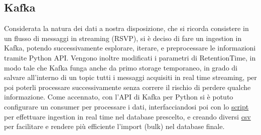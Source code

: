 \documentclass[fleqn,10pt]{SelfArx} %
\begin{document}
{\subsection{Kafka}
Considerata la natura dei dati a nostra disposizione, che si ricorda consistere in un flusso di messaggi in streaming (RSVP), si è deciso di fare un ingestion in Kafka, potendo successivamente esplorare, iterare, e preprocessare le informazioni tramite Python API.
Vengono inoltre modificati i parametri di RetentionTime, in modo tale che Kafka funga anche da primo storage temporaneo, in grado di salvare all'interno di un topic tutti i messaggi acquisiti in real time streaming, per poi poterli processare successivamente senza correre il rischio di perdere qualche informazione.
Come accennato, con l'API di Kafka per Python si è potuto configurare un consumer per processare i dati, interfacciandosi poi con lo \href{https://gitlab.com/DBertazioli/armeetup/blob/master/py_scripts/python-arango_from_kafka.py}{script} per effettuare ingestion in real time nel database prescelto, e creando diversi \href{https://gitlab.com/DBertazioli/armeetup/tree/master/csv/struttura}{csv} per facilitare e rendere più efficiente l'import (bulk) nel database finale.
}
\end{document}
